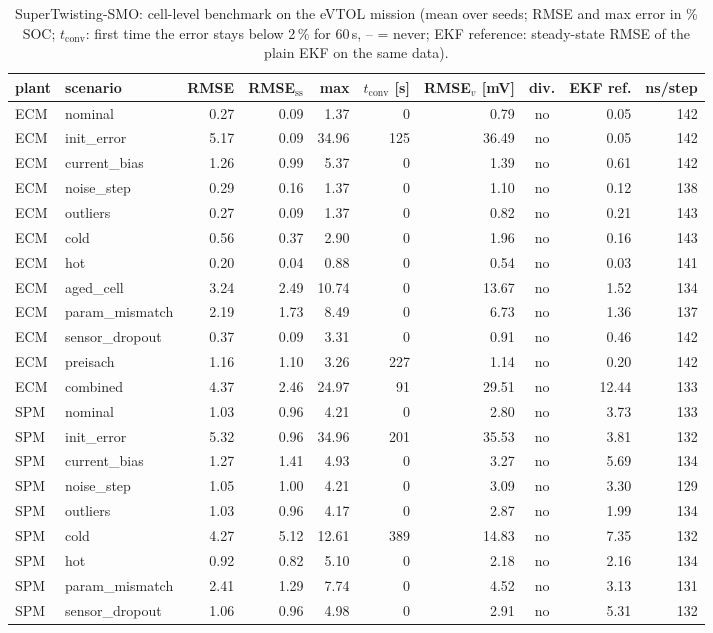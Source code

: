 \begin{table}[H]\centering\footnotesize\setlength{\tabcolsep}{4pt}
\caption{SuperTwisting-SMO: cell-level benchmark on the eVTOL mission (mean over seeds; RMSE and max error in \% SOC; $t_\mathrm{conv}$: first time the error stays below 2\,\% for 60\,s, -- = never; EKF reference: steady-state RMSE of the plain EKF on the same data).}\label{tab:cell_SuperTwistingSMO}
\begin{tabular}{llrrrrrcrr}\toprule
plant & scenario & RMSE & RMSE$_\mathrm{ss}$ & max & $t_\mathrm{conv}$ [s] & RMSE$_v$ [mV] & div. & EKF ref. & ns/step \\ \midrule
ECM & nominal & 0.27 & 0.09 & 1.37 & 0 & 0.79 & no & 0.05 & 142 \\
ECM & init\_error & 5.17 & 0.09 & 34.96 & 125 & 36.49 & no & 0.05 & 142 \\
ECM & current\_bias & 1.26 & 0.99 & 5.37 & 0 & 1.39 & no & 0.61 & 142 \\
ECM & noise\_step & 0.29 & 0.16 & 1.37 & 0 & 1.10 & no & 0.12 & 138 \\
ECM & outliers & 0.27 & 0.09 & 1.37 & 0 & 0.82 & no & 0.21 & 143 \\
ECM & cold & 0.56 & 0.37 & 2.90 & 0 & 1.96 & no & 0.16 & 143 \\
ECM & hot & 0.20 & 0.04 & 0.88 & 0 & 0.54 & no & 0.03 & 141 \\
ECM & aged\_cell & 3.24 & 2.49 & 10.74 & 0 & 13.67 & no & 1.52 & 134 \\
ECM & param\_mismatch & 2.19 & 1.73 & 8.49 & 0 & 6.73 & no & 1.36 & 137 \\
ECM & sensor\_dropout & 0.37 & 0.09 & 3.31 & 0 & 0.91 & no & 0.46 & 142 \\
ECM & preisach & 1.16 & 1.10 & 3.26 & 227 & 1.14 & no & 0.20 & 142 \\
ECM & combined & 4.37 & 2.46 & 24.97 & 91 & 29.51 & no & 12.44 & 133 \\
\midrule
SPM & nominal & 1.03 & 0.96 & 4.21 & 0 & 2.80 & no & 3.73 & 133 \\
SPM & init\_error & 5.32 & 0.96 & 34.96 & 201 & 35.53 & no & 3.81 & 132 \\
SPM & current\_bias & 1.27 & 1.41 & 4.93 & 0 & 3.27 & no & 5.69 & 134 \\
SPM & noise\_step & 1.05 & 1.00 & 4.21 & 0 & 3.09 & no & 3.30 & 129 \\
SPM & outliers & 1.03 & 0.96 & 4.17 & 0 & 2.87 & no & 1.99 & 134 \\
SPM & cold & 4.27 & 5.12 & 12.61 & 389 & 14.83 & no & 7.35 & 132 \\
SPM & hot & 0.92 & 0.82 & 5.10 & 0 & 2.18 & no & 2.16 & 134 \\
SPM & param\_mismatch & 2.41 & 1.29 & 7.74 & 0 & 4.52 & no & 3.13 & 131 \\
SPM & sensor\_dropout & 1.06 & 0.96 & 4.98 & 0 & 2.91 & no & 5.31 & 132 \\
\bottomrule\end{tabular}\end{table}
